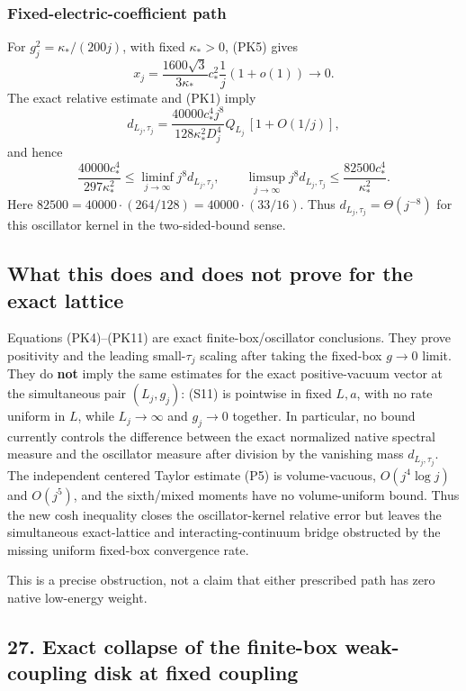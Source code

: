 \documentclass[
  11pt,
]{article}
\begin{document}
\subsubsection{Fixed-electric-coefficient
path}\label{fixed-electric-coefficient-path}

For \(g_j^2=\kappa_*/(200j)\), with fixed \(\kappa_*>0\), (PK5) gives \[
 x_j=\frac{1600\sqrt3}{3\kappa_*}c_*^2\frac1j(1+o(1))
 \longrightarrow0. \tag{PK9}
\] The exact relative estimate and (PK1) imply \[
 d_{L_j,\tau_j}
 =\frac{40000c_*^4j^8}{128\kappa_*^2D_j^4}Q_{L_j}
 \,[1+O(1/j)], \tag{PK10}
\] and hence \[
 \frac{40000c_*^4}{297\kappa_*^2}
 \le\liminf_{j\to\infty}j^8d_{L_j,\tau_j},
 \qquad
 \limsup_{j\to\infty}j^8d_{L_j,\tau_j}
 \le\frac{82500c_*^4}{\kappa_*^2}. \tag{PK11}
\] Here \(82500=40000\cdot(264/128)=40000\cdot(33/16)\). Thus
\(d_{L_j,\tau_j}=\Theta(j^{-8})\) for this oscillator kernel in the
two-sided-bound sense.

\subsection{What this does and does not prove for the exact
lattice}\label{what-this-does-and-does-not-prove-for-the-exact-lattice}

Equations (PK4)--(PK11) are exact finite-box/oscillator conclusions.
They prove positivity and the leading small-\(\tau_j\) scaling after
taking the fixed-box \(g\to0\) limit. They do \textbf{not} imply the
same estimates for the exact positive-vacuum vector at the simultaneous
pair \((L_j,g_j)\): (S11) is pointwise in fixed \(L,a\), with no rate
uniform in \(L\), while \(L_j\to\infty\) and \(g_j\to0\) together. In
particular, no bound currently controls the difference between the exact
normalized native spectral measure and the oscillator measure after
division by the vanishing mass \(d_{L_j,\tau_j}\). The independent
centered Taylor estimate (P5) is volume-vacuous, \(O(j^4\log j)\) and
\(O(j^5)\), and the sixth/mixed moments have no volume-uniform bound.
Thus the new cosh inequality closes the oscillator-kernel relative error
but leaves the simultaneous exact-lattice and interacting-continuum
bridge obstructed by the missing uniform fixed-box convergence rate.

This is a precise obstruction, not a claim that either prescribed path
has zero native low-energy weight.

\subsection{27. Exact collapse of the finite-box weak-coupling disk at
fixed
coupling}\label{exact-collapse-of-the-finite-box-weak-coupling-disk-at-fixed-coupling}
\end{document}
